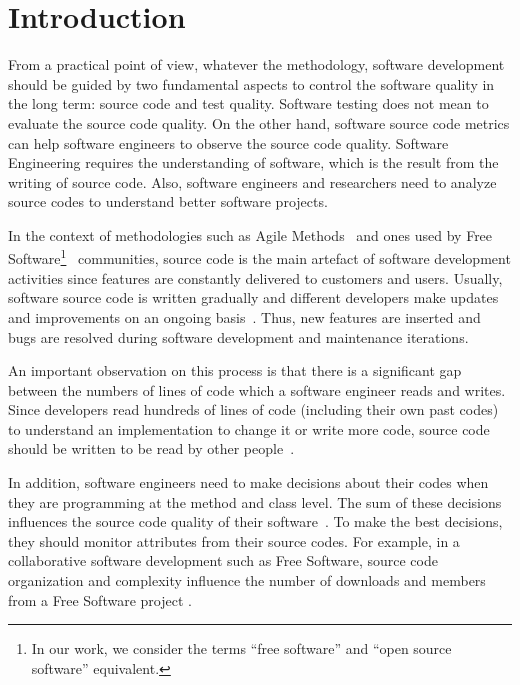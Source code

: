\section{Introduction}
\label{introduction}

From a practical point of view, whatever the methodology, software development
should be guided by two fundamental aspects to control the software quality
in the long term: source code and test quality.
%
Software testing does not mean to evaluate the source code quality. On the other
hand, software source code metrics can help software engineers to observe
the source code quality.
% 
Software Engineering requires the understanding of software, which is the
result from the writing of source code.
%
Also, software engineers and researchers need to analyze source codes to 
understand better software projects.

In the context of methodologies such as Agile Methods~\cite{beck1999} and ones
used by Free Software\footnote{In our work, we consider the terms
``free software'' and ``open source software'' equivalent.}~\cite{fsf}
communities, source code is the main artefact
of software development activities since features are constantly delivered to
customers and users.
%
Usually, software source code is written gradually and different
developers make updates and improvements on an ongoing basis~\cite{martin2008}.
%
%
Thus, new features are inserted and bugs are resolved during software
development and maintenance iterations.


An important observation on this process is that there is a significant gap
between the numbers of lines of code which a software engineer reads and writes.
%
Since developers read hundreds of lines of code (including their own past codes) to
understand an implementation to change it or write more code, source code should
be written to be read by other people~\cite{martin2008}.  


In addition, software engineers need to make decisions about their codes when
they are programming at the method and class level.
%
The sum of these decisions influences the source code quality of
their software~\cite{beck2007}.
%
To make the best decisions, they should monitor attributes from
their source codes. 
%
For example, in a collaborative software development such as Free Software,
source code organization and complexity influence the number of downloads and
members from a Free Software project \cite{meirelles2010}.   

